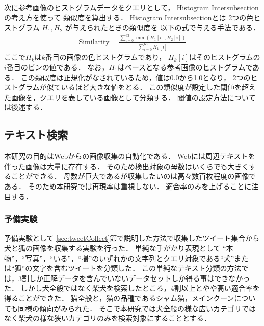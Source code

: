 \documentclass{deimj}
\begin{document}
次に参考画像のヒストグラムデータをクエリとして，
Histogram Intersubsection
\cite{Swain91colorindexing}
の考え方を使って
類似度を算出する．
Histogram Intersubsectionとは
2つの色ヒストグラム
$H_1,H_2$
が与えられたときの類似度を
以下の式で与える手法である．
%
\begin{eqnarray}
\mbox{Similarity} = \frac{\sum_{i=0}^{63} \min(H_1[i],H_2[i])}{\sum_{i=0}^{63} H_1[i]}
\end{eqnarray}
%
ここで$H_k$は$k$番目の画像の色ヒストグラムであり，
$H_k[i]$はそのヒストグラムの$i$番目のビンの値である．
なお，$H_1$はベースとなる参考画像のヒストグラムである．
この類似度は正規化がなされているため，値は0.0から1.0となり，
2つのヒストグラムが似ているほど大きな値をとる．
この類似度が設定した閾値を超えた画像を，クエリを表している画像として分類する．
閾値の設定方法については後述する．
\subsection{テキスト検索}
\label{sec:textSearch}

本研究の目的はWebからの画像収集の自動化である．
Webには周辺テキストを伴った画像は大量に存在する．
そのため検出対象の母数はいくらでも大きくすることができる．
母数が巨大であるが収集したいのは高々数百枚程度の画像である．
そのため本研究では再現率は重視しない．
適合率のみを上げることに注目する．

\subsubsection{予備実験}
\label{sec:yobijikken}

予備実験として
\ref{sec:tweetCollect}節で説明した方法で収集したツイート集合から
犬と狐の画像を収集する実験を行った．
単純な手がかり表現として
“本物”，“写真”，“いる”，“撮”のいずれかの文字列とクエリ対象である“犬”または“狐”の文字を含むツイートを分類した．
この単純なテキスト分類の方法では，3割しか正解データを含んでいないデータセットしか得る事はできなかった．
しかし犬全般ではなく柴犬を検索したところ，4割以上とやや高い適合率を得ることができた．
猫全般と，猫の品種であるシャム猫，メインクーンについても同様の傾向がみられた．
そこで本研究では犬全般の様な広いカテゴリではなく柴犬の様な狭いカテゴリのみを検索対象にすることとする．
\end{document}
